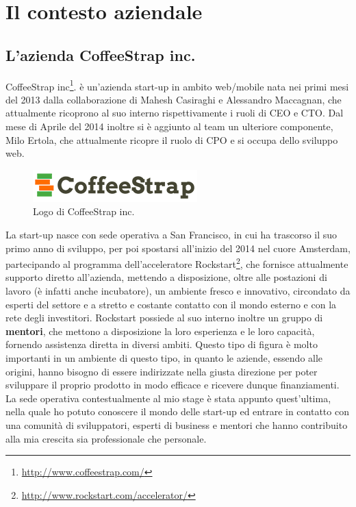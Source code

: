 
\chapter{Il contesto aziendale}
\label{cap:contesto-aziendale}

\section{L'azienda CoffeeStrap inc.}

CoffeeStrap inc\footnote{\url{http://www.coffeestrap.com/}}. è un'azienda \gls{start-up} in ambito web/mobile nata nei primi mesi del 2013 dalla collaborazione di Mahesh Casiraghi e Alessandro Maccagnan, che attualmente ricoprono al suo interno rispettivamente i ruoli di \gls{CEO} e \gls{CTO}. Dal mese di Aprile del 2014 inoltre si è aggiunto al team un ulteriore componente, Milo Ertola, che attualmente ricopre il ruolo di \gls{CPO} e si occupa dello sviluppo web. 

\begin{figure}[htpd]
\centering
\includegraphics[width=\textwidth/2]{../immagini/coffeestrap-logo}
\caption{Logo di CoffeeStrap inc.}  
\end{figure}

La start-up nasce con sede operativa a San Francisco, in cui ha trascorso il suo primo anno di sviluppo, per poi spostarsi all'inizio del 2014 nel cuore Amsterdam, partecipando al programma dell'\gls{acceleratore} Rockstart\footnote{\url{http://www.rockstart.com/accelerator/}}, che fornisce attualmente supporto diretto all'azienda, mettendo a disposizione, oltre alle postazioni di lavoro (è infatti anche \gls{incubatore}), un ambiente fresco e innovativo, circondato da esperti del settore e a stretto e costante contatto con il mondo esterno e con la rete degli investitori. Rockstart possiede al suo interno inoltre un gruppo di \textbf{mentori}, che mettono a disposizione la loro esperienza e le loro capacità, fornendo assistenza diretta in diversi ambiti. Questo tipo di figura è molto importanti in un ambiente di questo tipo, in quanto le aziende, essendo alle origini, hanno bisogno di essere indirizzate nella giusta direzione per poter sviluppare il proprio prodotto in modo efficace e ricevere dunque finanziamenti. La sede operativa contestualmente al mio stage è stata appunto quest'ultima, nella quale ho potuto conoscere il mondo delle start-up ed entrare in contatto con una comunità di sviluppatori, esperti di business e mentori che hanno contribuito alla mia crescita sia professionale che personale.

